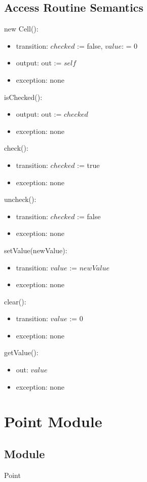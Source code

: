 \documentclass[12pt]{article}
\begin{document}
\subsection* {Access Routine Semantics}
new Cell():
\begin{itemize}
\item transition: $checked$ := false, $value$: = 0
\item output: out := $self$
\item exception: none
\end{itemize}
isChecked():
\begin{itemize}
\item output: out := $checked$
\item exception: none
\end{itemize}
check():
\begin{itemize}
\item transition: $checked$ := true
\item exception: none
\end{itemize}
uncheck():
\begin{itemize}
\item transition: $checked$ := false
\item exception: none
\end{itemize}
setValue(newValue):
\begin{itemize}
\item transition: $value$ := $newValue$
\item exception: none
\end{itemize}
clear():
\begin{itemize}
\item transition: $value$ := 0
\item exception: none
\end{itemize}
getValue():
\begin{itemize}
\item out: $value$
\item exception: none
\end{itemize}

\newpage




%

\section*{Point Module}
\subsection* {Module}
Point
\end{document}
